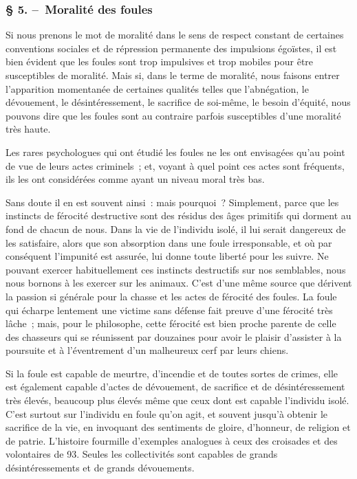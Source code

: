 \documentclass[french,twoside]{book} %
\begin{document}
\subsubsection[{§ 5. – Moralité des foules}]{§ 5. – Moralité des foules}
\noindent Si nous prenons le mot de moralité dans le sens de respect constant de certaines conventions sociales et de répression permanente des impulsions égoïstes, il est bien évident que les foules sont trop impulsives et trop mobiles pour être susceptibles de moralité. Mais si, dans le terme de moralité, nous faisons entrer l’apparition momenta­née de certaines qualités telles que l’abnégation, le dévouement, le désintéressement, le sacrifice de soi-même, le besoin d’équité, nous pouvons dire que les foules sont au contraire parfois susceptibles d’une moralité très haute.\par
Les rares psychologues qui ont étudié les foules ne les ont envisagées qu’au point de vue de leurs actes criminels ; et, voyant à quel point ces actes sont fréquents, ils les ont considérées comme ayant un niveau moral très bas.\par
Sans doute il en est souvent ainsi : mais pourquoi ? Simplement, parce que les instincts de férocité destructive sont des résidus des âges primitifs qui dorment au fond de chacun de nous. Dans la vie de l’individu isolé, il lui serait dangereux de les satisfaire, alors que son absorption dans une foule irresponsable, et où par conséquent l’impunité est assurée, lui donne toute liberté pour les suivre. Ne pouvant exercer habituellement ces instincts destructifs sur nos semblables, nous nous bornons à les exercer sur les animaux. C’est d’une même source que dérivent la passion si générale pour la chasse et les actes de férocité des foules. La foule qui écharpe lentement une victime sans défense fait preuve d’une férocité très lâche ; mais, pour le philosophe, cette férocité est bien proche parente de celle des chasseurs qui se réunissent par dou­zaines pour avoir le plaisir d’assister à la poursuite et à l’éventrement d’un malheureux cerf par leurs chiens.\par
Si la foule est capable de meurtre, d’incendie et de toutes sortes de crimes, elle est également capable d’actes de dévouement, de sacrifice et de désintéressement très élevés, beaucoup plus élevés même que ceux dont est capable l’individu isolé. C’est surtout sur l’individu en foule qu’on agit, et souvent jusqu’à obtenir le sacrifice de la vie, en invoquant des sentiments de gloire, d’honneur, de religion et de patrie. L’histoire fourmille d’exemples analogues à ceux des croisades et des volontaires de 93. Seules les collectivités sont capables de grands désintéressements et de grands dévouements.\par
\end{document}
